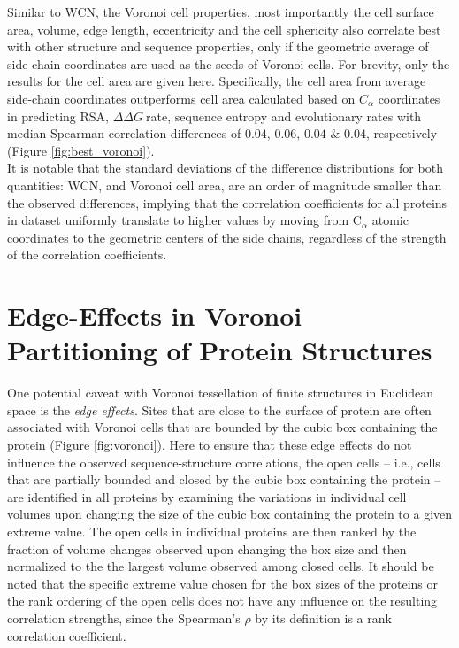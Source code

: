 \documentclass[11pt]{article}
\newcommand{\ddg}{$\Delta\Delta G~$}
\begin{document}
\begin{appendices}
    Similar to WCN, the Voronoi cell properties, most importantly the cell surface area, volume, edge length, eccentricity and the cell sphericity also correlate best with other structure and sequence properties, only if the geometric average of side chain coordinates are used as the seeds of Voronoi cells. For brevity, only the results for the cell area are given here. Specifically, the cell area from average side-chain coordinates outperforms cell area calculated based on $C_\alpha$ coordinates in predicting RSA, \ddg rate, sequence entropy and evolutionary rates with median Spearman correlation differences of $0.04$, $0.06$, $0.04$ \& $0.04$, respectively (Figure \ref{fig:best_voronoi}). \\

    It is notable that the standard deviations of the difference distributions for both quantities: WCN, and Voronoi cell area, are an order of magnitude smaller than the observed differences, implying that the correlation coefficients for all proteins in dataset uniformly translate to higher values by moving from C$_\alpha$ atomic coordinates to the geometric centers of the side chains, regardless of the strength of the correlation coefficients. \\

\section{Edge-Effects in Voronoi Partitioning of Protein Structures}
\label{app:edge_effects}

    One potential caveat with Voronoi tessellation of finite structures in Euclidean space is the {\it edge effects}. Sites that are close to the surface of protein are often associated with Voronoi cells that are bounded by the cubic box containing the protein (Figure \ref{fig:voronoi}). Here to ensure that these edge effects do not influence the observed sequence-structure correlations, the open cells -- i.e., cells that are partially bounded and closed by the cubic box containing the protein -- are identified in all proteins by examining the variations in individual cell volumes upon changing the size of the cubic box containing the protein to a given extreme value. The open cells in individual proteins are then ranked by the fraction of volume changes observed upon changing the box size and then normalized to the the largest volume observed among closed cells. It should be noted that the specific extreme value chosen for the box sizes of the proteins or the rank ordering of the open cells does not have any influence on the resulting correlation strengths, since the Spearman's $\rho$ by its definition is a rank correlation coefficient. \\


\end{appendices}
\end{document}
